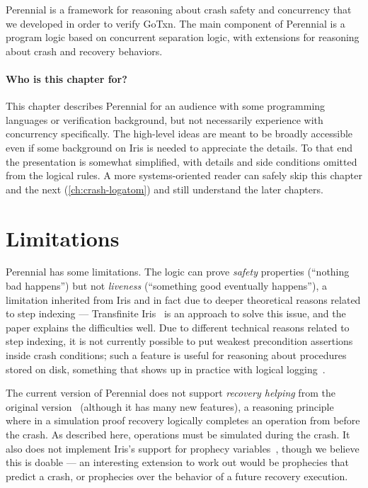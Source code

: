 Perennial is a framework for reasoning about crash safety and concurrency that
we developed in order to verify GoTxn. The main component of Perennial is a
program logic based on concurrent separation logic, with extensions for
reasoning about crash and recovery behaviors.

\paragraph{Who is this chapter for?}
This chapter describes Perennial for an audience with some programming languages
or verification background, but not necessarily experience with concurrency
specifically. The high-level ideas are meant to be broadly accessible even if
some background on Iris is needed to appreciate the details. To that end the
presentation is somewhat simplified, with details and side conditions omitted
from the logical rules. A more systems-oriented reader can safely skip this
chapter and the next (\cref{ch:crash-logatom}) and still understand the later
chapters.




\section{Limitations}
\label{sec:perennial:limitations}

Perennial has some limitations. The logic can prove \emph{safety} properties
(``nothing bad happens'') but not \emph{liveness} (``something good eventually
happens''), a limitation inherited from Iris and in fact due to deeper
theoretical reasons related to step indexing --- Transfinite Iris~\cite{spies:transfinite} is an approach
to solve this issue, and the paper explains the difficulties well.
Due to different technical reasons related to step indexing, it is not currently
possible to put weakest precondition assertions inside crash conditions; such a
feature is useful for reasoning about procedures stored on disk, something that
shows up in practice with logical logging~\cite{mohan:aries}.

The current version of Perennial does not support \emph{recovery helping} from
the original version~\cite{chajed:perennial} (although it has many new
features), a reasoning principle where in a simulation proof recovery logically
completes an operation from before the crash. As described here, operations must
be simulated during the crash. It also does not implement Iris's support for
prophecy variables~\cite{jung:prophecy}, though we believe this is doable --- an
interesting extension to work out would be prophecies that predict a crash, or
prophecies over the behavior of a future recovery execution.

